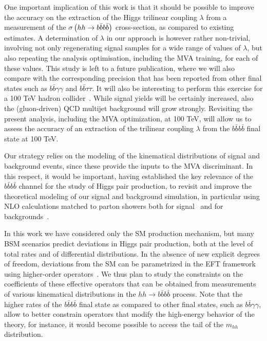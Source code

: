 One important implication of this work is that it should
be possible to improve  the accuracy on the extraction of
the Higgs trilinear coupling $\lambda$ from
a measurement of the
$\sigma\left( hh\to b\bar{b}b\bar{b}\right)$ cross-section, as compared
to existing estimates.
%
A determination of $\lambda$ in our approach is however
rather
non-trivial, involving
 not only regenerating signal samples
 for a wide range of values of  $\lambda$, but also
 repeating the analysis
optimisation, including the MVA training, for each
of these values.
%
This study is left to a future
publication, where we will also
compare with the corresponding  precision 
that has been reported from other final states such as
 $b\bar{b}\gamma\gamma$
and $b\bar{b}\tau\tau$.
%
It will also be  interesting to perform
this exercise for a 100 TeV hadron collider~\cite{Barr:2014sga,
  Azatov:2015oxa,Papaefstathiou:2015iba,
  Arkani-Hamed:2015vfh}.
%
While signal yields will be certainly increased, also the (gluon-driven) QCD
multijet background will grow strongly.
%
Revisiting
the present analysis, including the MVA optimization,
at 100 TeV, will allow us
to assess the accuracy of an extraction of the trilinear
coupling $\lambda$ from the $b\bar{b}b\bar{b}$ final state
at 100 TeV.


Our strategy relies on the modeling of the kinematical
distributions of signal and background events, since these provide
the inputs to the MVA discriminant.
%
In this respect, it would be important, having established the key
relevance of the $b\bar{b}b\bar{b}$ channel for the study of
Higgs pair production, to revisit and improve the
theoretical modeling of our signal and background simulation,
in particular using NLO calculations matched to
parton showers both for signal~\cite{Frederix:2014hta,Maierhofer:2013sha}
and for backgrounds~\cite{Alwall:2014hca,Gleisberg:2008ta}.
%

In this work we have considered only the SM production mechanism,
but many BSM scenarios predict deviations
in Higgs pair production, both at the level of total rates
and of
differential distributions.
%
In the absence of new explicit degrees of freedom,
deviations from the SM can be parametrized in
the EFT framework using higher-order
operators~\cite{Azatov:2015oxa,Goertz:2014qta}.
%
We thus plan to study the constraints
on the coefficients of these effective
operators that can be obtained from measurements
of various kinematical distributions
in the $hh\to b\bar{b}b\bar{b}$ process.
%
Note that the higher rates of the $b\bar{b}b\bar{b}$ final state as compared to
other final states, such as
$b\bar{b}\gamma\gamma$, allow to better constrain operators
that modify the high-energy behavior
of the theory, for instance,
it would become possible
to access the tail of the $m_{hh}$ distribution.


